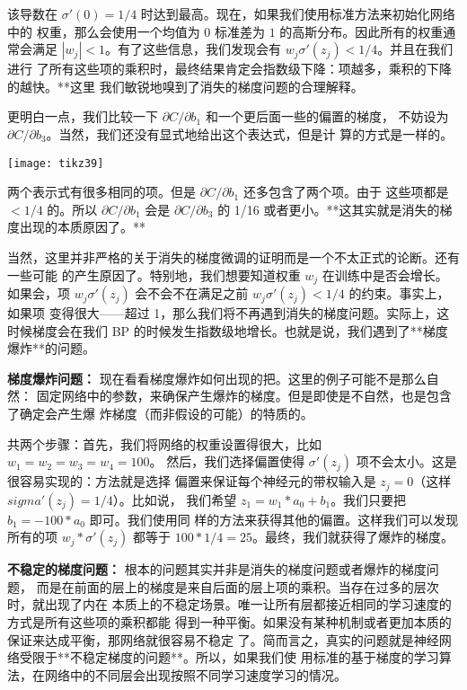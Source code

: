 该导数在 $\sigma'(0)=1/4$ 时达到最高。现在，如果我们使用标准方法来初始化网络中的
权重，那么会使用一个均值为 $0$ 标准差为 $1$ 的高斯分布。因此所有的权重通常会满足
$|w_j| < 1$。有了这些信息，我们发现会有 $w_j \sigma'(z_j) < 1/4$。并且在我们进行
了所有这些项的乘积时，最终结果肯定会指数级下降：项越多，乘积的下降的越快。**这里
我们敏锐地嗅到了消失的梯度问题的合理解释。
 
更明白一点，我们比较一下 $\partial C/\partial b_1$ 和一个更后面一些的偏置的梯度，
不妨设为 $\partial C/\partial b_3$。当然，我们还没有显式地给出这个表达式，但是计
算的方式是一样的。
 
\begin{center}
  \texttt{[image: tikz39]}
\end{center}

两个表示式有很多相同的项。但是 $\partial C/\partial b_1$ 还多包含了两个项。由于
这些项都是 $< 1/4$ 的。所以 $\partial C/\partial b_1$ 会是 $\partial C/\partial
b_3$ 的 1/16 或者更小。**这其实就是消失的梯度出现的本质原因了。**

当然，这里并非严格的关于消失的梯度微调的证明而是一个不太正式的论断。还有一些可能
的产生原因了。特别地，我们想要知道权重 $w_j$ 在训练中是否会增长。如果会，项 $w_j
\sigma'(z_j)$ 会不会不在满足之前 $w_j \sigma'(z_j) < 1/4$ 的约束。事实上，如果项
变得很大——超过 1，那么我们将不再遇到消失的梯度问题。实际上，这时候梯度会在我们
BP 的时候发生指数级地增长。也就是说，我们遇到了**梯度爆炸**的问题。

\textbf{梯度爆炸问题：} 现在看看梯度爆炸如何出现的把。这里的例子可能不是那么自然：
固定网络中的参数，来确保产生爆炸的梯度。但是即使是不自然，也是包含了确定会产生爆
炸梯度（而非假设的可能）的特质的。
 
共两个步骤：首先，我们将网络的权重设置得很大，比如 $w_1 = w_2 = w_3 = w_4 = 100$。
然后，我们选择偏置使得 $\sigma'(z_j)$ 项不会太小。这是很容易实现的：方法就是选择
偏置来保证每个神经元的带权输入是 $z_j = 0$（这样 $sigma'(z_j) = 1/4$）。比如说，
我们希望 $z_1 = w_1 * a_0 + b_1$。我们只要把 $b_1 = -100 * a_0$ 即可。我们使用同
样的方法来获得其他的偏置。这样我们可以发现所有的项 $w_j * \sigma'(z_j)$ 都等于
$100*1/4 = 25$。最终，我们就获得了爆炸的梯度。
 
\textbf{不稳定的梯度问题：} 根本的问题其实并非是消失的梯度问题或者爆炸的梯度问题，
而是在前面的层上的梯度是来自后面的层上项的乘积。当存在过多的层次时，就出现了内在
本质上的不稳定场景。唯一让所有层都接近相同的学习速度的方式是所有这些项的乘积都能
得到一种平衡。如果没有某种机制或者更加本质的保证来达成平衡，那网络就很容易不稳定
了。简而言之，真实的问题就是神经网络受限于**不稳定梯度的问题**。所以，如果我们使
用标准的基于梯度的学习算法，在网络中的不同层会出现按照不同学习速度学习的情况。

